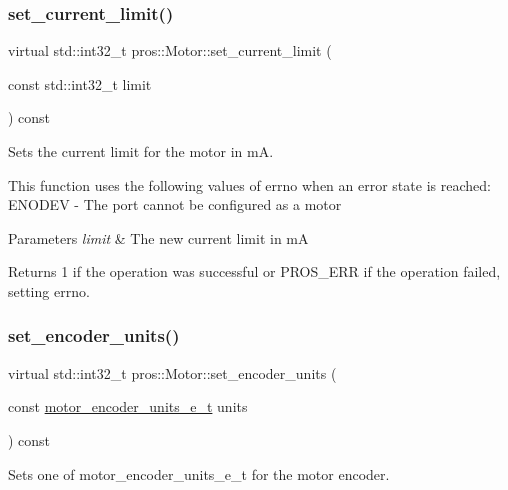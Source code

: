 \subsubsection{\texorpdfstring{set\+\_\+current\+\_\+limit()}{set\_current\_limit()}}
{\footnotesize\ttfamily virtual std\+::int32\+\_\+t pros\+::\+Motor\+::set\+\_\+current\+\_\+limit (\begin{DoxyParamCaption}\item[{const std\+::int32\+\_\+t}]{limit }\end{DoxyParamCaption}) const\hspace{0.3cm}{\ttfamily [virtual]}}



Sets the current limit for the motor in mA. 

This function uses the following values of errno when an error state is reached\+: E\+N\+O\+D\+EV -\/ The port cannot be configured as a motor


\begin{DoxyParams}{Parameters}
{\em limit} & The new current limit in mA\\
\hline
\end{DoxyParams}
\begin{DoxyReturn}{Returns}
1 if the operation was successful or P\+R\+O\+S\+\_\+\+E\+RR if the operation failed, setting errno. 
\end{DoxyReturn}
\mbox{\label{classpros_1_1Motor_a2d2fea8d5967d1e41471111aa89afd84}} 
\subsubsection{\texorpdfstring{set\+\_\+encoder\+\_\+units()}{set\_encoder\_units()}}
{\footnotesize\ttfamily virtual std\+::int32\+\_\+t pros\+::\+Motor\+::set\+\_\+encoder\+\_\+units (\begin{DoxyParamCaption}\item[{const \hyperlink{motors_8h_a6677ba23760c558fd8b7b4e1e00a6123}{motor\+\_\+encoder\+\_\+units\+\_\+e\+\_\+t}}]{units }\end{DoxyParamCaption}) const\hspace{0.3cm}{\ttfamily [virtual]}}



Sets one of motor\+\_\+encoder\+\_\+units\+\_\+e\+\_\+t for the motor encoder. 

